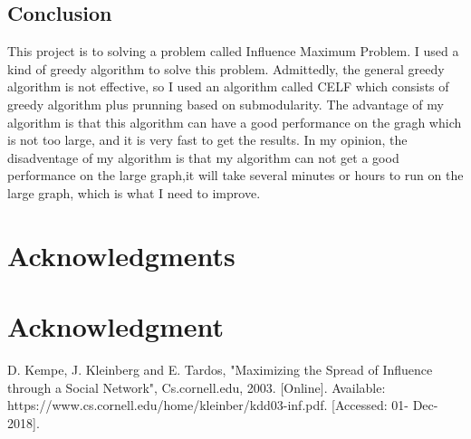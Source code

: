 \documentclass[conference,compsoc]{IEEEtran}
\begin{document}
\subsection{Conclusion}
This project is to solving a problem called Influence Maximum Problem. I used a kind of greedy algorithm to solve this problem. Admittedly, the general greedy algorithm is not effective, so I used an algorithm called CELF which consists of greedy algorithm plus prunning based on submodularity. The advantage of  my algorithm is that this algorithm can have a good performance on the gragh which is not too large, and it is very fast to get the results. In my opinion, the disadventage of my algorithm is that my algorithm can not get a good performance on the large graph,it will take several minutes or hours to run on the large graph, which is what I need to improve.

\ifCLASSOPTIONcompsoc
  \section*{Acknowledgments}
\else
  \section*{Acknowledgment}
\fi










%
%
\begin{thebibliography}{1}
 D. Kempe, J. Kleinberg and E. Tardos, "Maximizing the Spread of Influence through a Social Network", Cs.cornell.edu, 2003. [Online]. Available: https://www.cs.cornell.edu/home/kleinber/kdd03-inf.pdf. [Accessed: 01- Dec- 2018].
\end{thebibliography}





\end{document}
